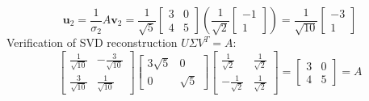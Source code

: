 \begin{enumerate}[label=(\alph*)]
\[    \]
    \[
    \mathbf{u}_2 = \frac{1}{\sigma_2} A \mathbf{v}_2 = \frac{1}{\sqrt{5}} \begin{bmatrix} 3 & 0 \\ 4 & 5 \end{bmatrix} \left( \frac{1}{\sqrt{2}}\begin{bmatrix} -1 \\ 1 \end{bmatrix} \right) = \frac{1}{\sqrt{10}} \begin{bmatrix} -3 \\ 1 \end{bmatrix}
    \]
    Verification of SVD reconstruction $U \Sigma V^T = A$:
    \[
    \begin{bmatrix} \frac{1}{\sqrt{10}} & -\frac{3}{\sqrt{10}} \\ \frac{3}{\sqrt{10}} & \frac{1}{\sqrt{10}} \end{bmatrix} \begin{bmatrix} 3\sqrt{5} & 0 \\ 0 & \sqrt{5} \end{bmatrix} \begin{bmatrix} \frac{1}{\sqrt{2}} & \frac{1}{\sqrt{2}} \\ -\frac{1}{\sqrt{2}} & \frac{1}{\sqrt{2}} \end{bmatrix} = \begin{bmatrix} 3 & 0 \\ 4 & 5 \end{bmatrix} = A
    \]
\end{enumerate}

